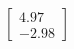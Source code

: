 \documentclass[preview]{standalone}
\begin{document}
\begin{align*}
\begin{bmatrix} 4.97 \\ -2.98 \end{bmatrix}
\end{align*}
\end{document}
